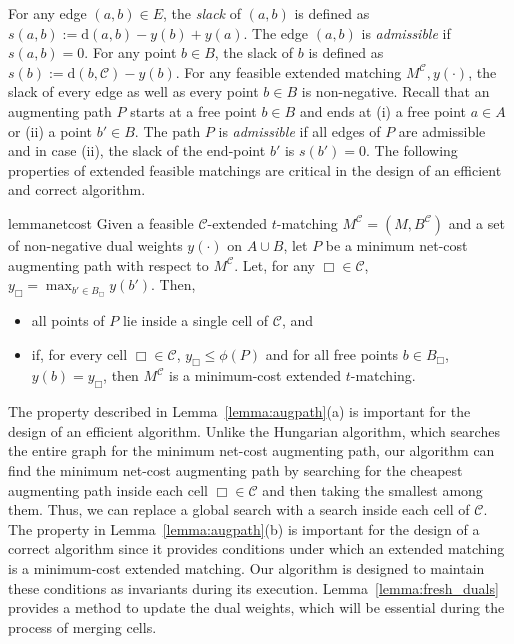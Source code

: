 \documentclass[11pt,onecolumn]{article}
\def\mcC{{\mathcal{C}}}
\newcommand{\cell}{\Box}
\newcommand{\distance}[2]{\mathrm{d}(#1, #2)}
\begin{document}
For any  edge $(a,b)\in E$, the \emph{slack} of $(a,b)$ is defined as $s(a,b):=\distance{a}{b} - y(b) + y(a)$. The edge $(a,b)$ is \emph{admissible} if $s(a,b)=0$. For any point $b\in B$, the slack of $b$ is defined as $s(b):=\distance{b}{\mcC} - y(b)$. For any feasible extended matching $M^{\mcC}, y(\cdot)$, the slack of every edge as well as every point $b \in B$ is non-negative.
Recall that an augmenting path $P$ starts at a free point $b\in B$ and ends at (i) a free point $a\in A$ or (ii) a point $b'\in B$. The path $P$ is \emph{admissible} if all edges of $P$ are admissible and in case (ii), the slack of the end-point $b'$ is $s(b')=0$.
The following properties of extended feasible matchings are critical in the design of an efficient and correct algorithm.


\begin{restatable}{lemma}{netcost}\label{lemma:augpath}
Given a feasible $\mcC$-extended $t$-matching $M^{\mcC} = (M, B^{\mcC})$ and a set of non-negative dual weights $y(\cdot)$ on $A\cup B$, let $P$ be a minimum net-cost augmenting path with respect to $M^{\mcC}$. Let, for any $\cell \in \mcC$, $y_\cell=\max_{b' \in B_{\cell}} y(b')$.
Then, 
\begin{itemize}
\item[(a)] all points of $P$ lie inside a single cell of $\mcC$, and
\item[(b)] if, for every cell $\cell \in \mcC$, $y_\cell \le \phi(P)$ and for all free points $b\in B_\cell$, $y(b) = y_\cell$, then $M^\mcC$ is a minimum-cost extended $t$-matching.
\end{itemize}
\end{restatable}

\vspace{1em}
The property described in Lemma~\ref{lemma:augpath}(a) is important for the design of an efficient algorithm. Unlike the Hungarian algorithm, which searches the entire graph for the minimum net-cost augmenting path, our algorithm can find the minimum net-cost augmenting path by searching for the cheapest augmenting path inside each cell $\cell \in\mcC$ and then taking the smallest among them. Thus, we can replace a global search with a search inside each cell of $\mcC$.
The property in Lemma~\ref{lemma:augpath}(b) is important for the design of a correct algorithm since it provides conditions under which an extended matching is a minimum-cost extended matching. Our algorithm is designed to maintain these conditions as invariants during its execution.  
Lemma~\ref{lemma:fresh_duals} provides a method to update the dual weights, which will be essential during the process of merging cells.
\end{document}

